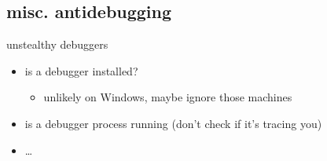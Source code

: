\subsection{misc. antidebugging}

\begin{frame}[fragile,label=unstealthyDebuggers]{unstealthy debuggers}
    \begin{itemize}
    \item is a debugger installed?
        \begin{itemize}
        \item unlikely on Windows, maybe ignore those machines
        \end{itemize}
    \item is a debugger process running (don't check if it's tracing you)
    \item \ldots
    \end{itemize}
\end{frame}

